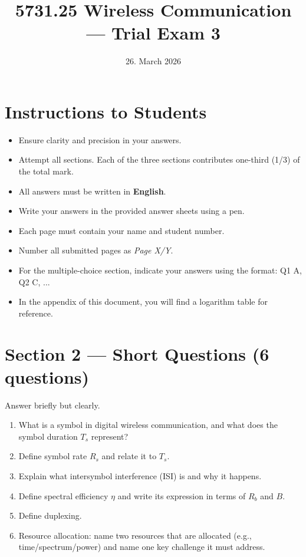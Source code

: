 \documentclass[11pt,a4paper]{article}
\begin{document}
\pagestyle{fancy}
\fancyhf{}
\renewcommand{\headrulewidth}{0pt}
\renewcommand{\footrulewidth}{0pt}
\fancyfoot[R]{\thepage/\pageref{LastPage}}
\fancypagestyle{plain}{
    \fancyhf{}
    \fancyfoot[R]{\thepage/\pageref{LastPage}}
    \renewcommand{\headrulewidth}{0pt}
    \renewcommand{\footrulewidth}{0pt}
}

\title{5731.25 Wireless Communication --- Trial Exam 3}
\date{26. March 2026}
\maketitle

\section*{Instructions to Students}
\begin{itemize}
    \item Ensure clarity and precision in your answers.
    \item Attempt all sections. Each of the three sections contributes one-third (1/3) of the total mark.
    \item All answers must be written in \textbf{English}.
    \item Write your answers in the provided answer sheets using a pen.
    \item Each page must contain your name and student number.
    \item Number all submitted pages as \textit{Page X/Y}.
    \item For the multiple-choice section, indicate your answers using the format: Q1 A, Q2 C, ...
    \item In the appendix of this document, you will find a logarithm table for reference.
\end{itemize}

\newpage

\newpage

\section*{Section 2 --- Short Questions (6 questions)}
Answer briefly but clearly.

\begin{enumerate}[leftmargin=0.9cm]
\item What is a symbol in digital wireless communication, and what does the symbol duration $T_s$ represent?

\item Define symbol rate $R_s$ and relate it to $T_s$.

\item Explain what intersymbol interference (ISI) is and why it happens.

\item Define spectral efficiency $\eta$ and write its expression in terms of $R_b$ and $B$.

\item Define duplexing.

\item Resource allocation: name two resources that are allocated (e.g., time/spectrum/power) and name one key challenge it must address.
\end{enumerate}
\end{document}
